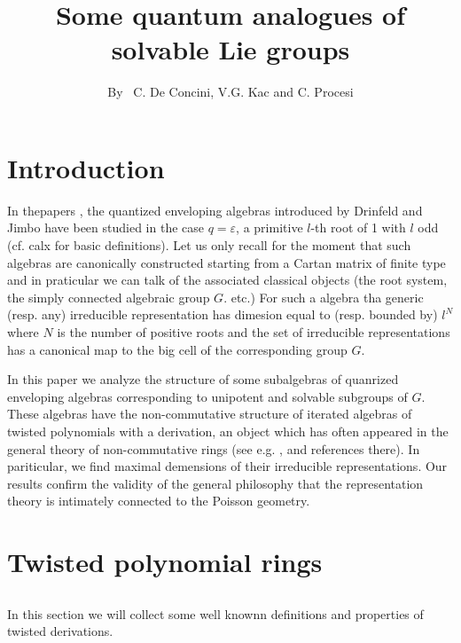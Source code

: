 \title{Some quantum analogues of solvable Lie groups}

\author{By~ C. De Concini, V.G. Kac and C. Procesi}

\date{}
\maketitle

\section*{Introduction}
In the\pageoriginale papers \cite[DK]{art4-key1-2}, \cite[DKP]{art4-key1-2} the quantized enveloping algebras introduced by Drinfeld and Jimbo have been studied in the case $q=\varepsilon$, a primitive $l$-th root of 1 with $l$ odd (cf. calx for basic definitions). Let us only recall for the moment that such algebras are canonically constructed starting from a Cartan matrix of finite type and in praticular we can talk of the associated classical objects (the root system, the simply connected algebraic group $G$. etc.) For such a algebra tha generic (resp. any) irreducible representation has dimesion equal to (resp. bounded by) $l^{N}$ where $N$ is the number of positive roots and the set of irreducible representations has a canonical map to the big cell of the corresponding group $G$.

In this paper we analyze the structure of some subalgebras of quanrized enveloping algebras corresponding to unipotent and solvable subgroups of $G$. These algebras have the non-commutative structure of iterated algebras of twisted polynomials with a derivation, an object which has often appeared in the general theory of non-commutative rings (see e.g. \cite{art4-keyKP}, \cite{art4-keyGL} and references there). In  pariticular, we find maximal demensions of their irreducible representations. Our results confirm the validity of the general philosophy that the representation theory is intimately connected to the Poisson geometry.

\section{Twisted polynomial rings}

\subsection{}
In this section we will collect some well knownn definitions and properties of twisted derivations.\label{art4-subsec-1.1}

